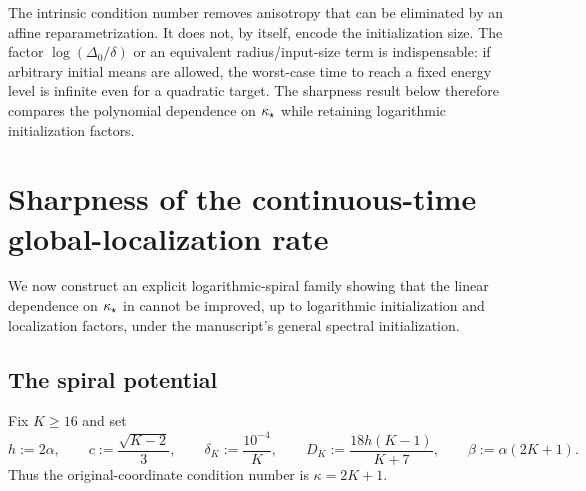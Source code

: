 \begin{remark}
The intrinsic condition number removes anisotropy that can be eliminated by an affine
reparametrization.  It does not, by itself, encode the initialization size.  The factor
$\log(\Delta_0/\delta)$ or an equivalent radius/input-size term is indispensable: if arbitrary
initial means are allowed, the worst-case time to reach a fixed energy level is infinite even for a
quadratic target.  The sharpness result below therefore compares the polynomial dependence on
$\kappa_\star$ while retaining logarithmic initialization factors.
\end{remark}

\section{Sharpness of the continuous-time global-localization rate}
\label{sec:cont-sharp}

We now construct an explicit logarithmic-spiral family showing that the linear dependence on
$\kappa_\star$ in  cannot be improved, up to logarithmic initialization and
localization factors, under the manuscript's general spectral initialization.

\subsection{The spiral potential}

Fix $K\geq16$ and set
\begin{equation}
\label{eq:spiral-parameters}
    h:=2\alpha,
    \qquad
    c:=\frac{\sqrt{K-2}}3,
    \qquad
    \delta_K:=\frac{10^{-4}}K,
    \qquad
    D_K:=\frac{18h(K-1)}{K+7},
    \qquad
    \beta:=\alpha(2K+1).
\end{equation}
Thus the original-coordinate condition number is $\kappa=2K+1$.

